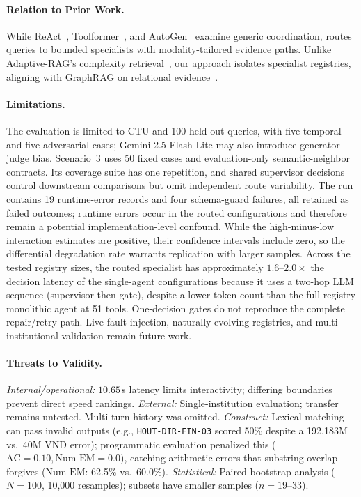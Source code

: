 \paragraph{Relation to Prior Work.}
While ReAct~\cite{yao2023react}, Toolformer~\cite{schick2023toolformer}, and AutoGen~\cite{wu2023autogen} examine generic coordination, \system{} routes queries to bounded specialists with modality-tailored evidence paths. Unlike Adaptive-RAG's complexity retrieval~\cite{jeong2024adaptiverag}, our approach isolates specialist registries, aligning with GraphRAG on relational evidence~\cite{edge2024graphrag}.

\paragraph{Limitations.}
The evaluation is limited to CTU and 100 held-out queries, with five temporal and five adversarial cases; Gemini 2.5 Flash Lite may also introduce generator--judge bias. Scenario~3 uses 50 fixed cases and evaluation-only semantic-neighbor contracts. Its coverage suite has one repetition, and shared supervisor decisions control downstream comparisons but omit independent route variability. The run contains 19 runtime-error records and four schema-guard failures, all retained as failed outcomes; runtime errors occur in the routed configurations and therefore remain a potential implementation-level confound. While the high-minus-low interaction estimates are positive, their confidence intervals include zero, so the differential degradation rate warrants replication with larger samples. Across the tested registry sizes, the routed specialist has approximately $1.6$--$2.0\times$ the decision latency of the single-agent configurations because it uses a two-hop LLM sequence (supervisor then gate), despite a lower token count than the full-registry monolithic agent at 51 tools. One-decision gates do not reproduce the complete repair/retry path. Live fault injection, naturally evolving registries, and multi-institutional validation remain future work.

\paragraph{Threats to Validity.}
\emph{Internal/operational:} $10.65$\,s latency limits interactivity; differing boundaries prevent direct speed rankings. \emph{External:} Single-institution evaluation; transfer remains untested. Multi-turn history was omitted. \emph{Construct:} Lexical matching can pass invalid outputs (e.g., \texttt{HOUT-DIR-FIN-03} scored 50\% despite a 192.183M vs.\ 40M VND error); programmatic evaluation penalized this ($\text{AC}=0.10, \text{Num-EM}=0.0$), catching arithmetic errors that substring overlap forgives ($\text{Num-EM}$: 62.5\% vs.\ 60.0\%). \emph{Statistical:} Paired bootstrap analysis ($N{=}100$, 10,000 resamples); subsets have smaller samples ($n=19$--$33$).
